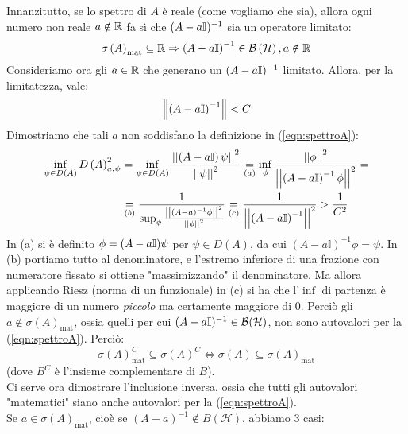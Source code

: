 Innanzitutto, se lo spettro di $A$ è reale (come vogliamo che sia), allora ogni numero non reale $a\notin \mathbb{R}$ fa sì che $(A-a\mathbb{I})^{-1}$ sia un operatore limitato:
\[ \sigma \left(A\right)_{\text{mat}}\subseteq \mathbb{R} \Rightarrow \left(A-a\mathbb{I}\right)^{-1}\in \mathcal{B}\left(\mathcal{H}\right), a\notin \mathbb{R} 
\]
Consideriamo ora gli $a\in \mathbb{R}$ che generano un $(A-a\mathbb{I})^{-1}$ limitato. Allora, per la limitatezza, vale:
\[
\left\lVert\left(A-a\mathbb{I}\right)^{-1}\right\rVert<C
\]
Dimostriamo che tali $a$ non soddisfano la definizione in (\ref{eqn:spettroA}):
\begin{align*}
\inf_{\psi\in D\left(A\right)}{D\left(A\right)_{a,\psi}^2}
&=\inf_{\psi\in D\left(A\right)}{\frac{\left|\left|\left(A-a\mathbb{I}\right)\psi\right|\right|^2}{\left|\left|\psi\right|\right|^2}}
\underset{(a)}{=}\inf_\phi{\frac{\left|\left|\phi\right|\right|^2}{\left|\left|\left(A-a\mathbb{I}\right)^{-1}\phi\right|\right|^2}}=\\
&\underset{(b)}{=}\frac{1}{\sup_\phi{\frac{\left|\left|\left(A-a\right)^{-1}\phi\right|\right|^2}{\left|\left|\phi\right|\right|^2}}}\underset{(c)}{=}\frac{1}{\left|\left|\left(A-a\mathbb{I}\right)^{-1}\right|\right|^2}>\frac{1}{C^2}
\end{align*}
In (a) si è definito $\phi = (A-a\mathbb{I})\psi$ per $\psi \in D\left(A\right)$, da cui $\left(A-a\mathbb{I}\right)^{-1}\phi =\psi$. In (b) portiamo tutto al denominatore, e l'estremo inferiore di una frazione con numeratore fissato si ottiene "massimizzando" il denominatore. Ma allora applicando Riesz (norma di un funzionale) in (c) si ha che l'$\inf$ di partenza è maggiore di un numero \textit{piccolo} ma certamente maggiore di $0$. Perciò gli $a \notin \sigma(A)_{\text{mat}}$, ossia quelli per cui $(A-a\mathbb{I})^{-1}\in\mathcal{B}(\mathcal{H})$, non sono autovalori per la (\ref{eqn:spettroA}). Perciò:
\[
\sigma(A)_{\text{mat}}^C \subseteq \sigma(A)^C \Leftrightarrow \sigma(A) \subseteq \sigma(A)_{\text{mat}}
\]
(dove $B^C$ è l'insieme complementare di $B$).\\
Ci serve ora dimostrare l'inclusione inversa, ossia che tutti gli autovalori "matematici" siano anche autovalori per la (\ref{eqn:spettroA}).\\
Se $a\in\sigma(A)_{\text{mat}}$, cioè se $\left(A-a\right)^{-1}\notin B\left(\mathcal{H}\right)$,  abbiamo 3 casi:

